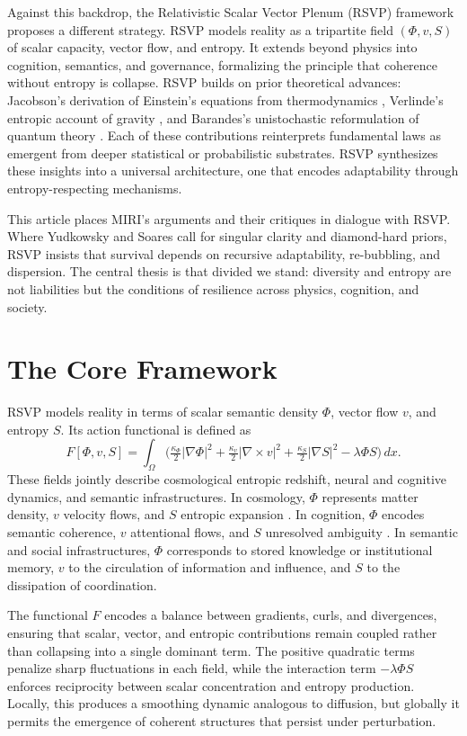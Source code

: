 \documentclass[12pt]{article}
\begin{document}
Against this backdrop, the Relativistic Scalar Vector Plenum (RSVP) framework proposes a different strategy. RSVP models reality as a tripartite field $(\Phi, v, S)$ of scalar capacity, vector flow, and entropy. It extends beyond physics into cognition, semantics, and governance, formalizing the principle that coherence without entropy is collapse. RSVP builds on prior theoretical advances: Jacobson’s derivation of Einstein’s equations from thermodynamics \citep{jacobson1995thermodynamics}, Verlinde’s entropic account of gravity \citep{verlinde2011entropic}, and Barandes’s unistochastic reformulation of quantum theory \citep{barandes2022unistochastic}. Each of these contributions reinterprets fundamental laws as emergent from deeper statistical or probabilistic substrates. RSVP synthesizes these insights into a universal architecture, one that encodes adaptability through entropy-respecting mechanisms.

This article places MIRI’s arguments and their critiques in dialogue with RSVP. Where Yudkowsky and Soares call for singular clarity and diamond-hard priors, RSVP insists that survival depends on recursive adaptability, re-bubbling, and dispersion. The central thesis is that divided we stand: diversity and entropy are not liabilities but the conditions of resilience across physics, cognition, and society.

\section{The Core Framework}
RSVP models reality in terms of scalar semantic density $\Phi$, vector flow $v$, and entropy $S$. Its action functional is defined as
\[
F[\Phi,v,S] = \int_\Omega \Big(\tfrac{\kappa_\Phi}{2}|\nabla\Phi|^2 + \tfrac{\kappa_v}{2}|\nabla\times v|^2 + \tfrac{\kappa_S}{2}|\nabla S|^2 - \lambda \Phi S\Big)\,dx.
\]
These fields jointly describe cosmological entropic redshift, neural and cognitive dynamics, and semantic infrastructures. In cosmology, $\Phi$ represents matter density, $v$ velocity flows, and $S$ entropic expansion \citep{jacobson1995thermodynamics}. In cognition, $\Phi$ encodes semantic coherence, $v$ attentional flows, and $S$ unresolved ambiguity \citep{friston2010free}. In semantic and social infrastructures, $\Phi$ corresponds to stored knowledge or institutional memory, $v$ to the circulation of information and influence, and $S$ to the dissipation of coordination. 

The functional $F$ encodes a balance between gradients, curls, and divergences, ensuring that scalar, vector, and entropic contributions remain coupled rather than collapsing into a single dominant term. The positive quadratic terms penalize sharp fluctuations in each field, while the interaction term $-\lambda \Phi S$ enforces reciprocity between scalar concentration and entropy production. Locally, this produces a smoothing dynamic analogous to diffusion, but globally it permits the emergence of coherent structures that persist under perturbation. 
\end{document}
